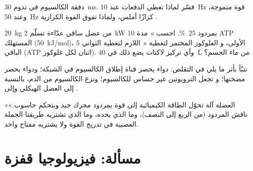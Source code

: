 \begin{exercise}[$\star\star$]\label{exo:b2:muscle-movement:9}
دفقة الكالسيوم في  تدوم \qty{30}{ms}. فسّر لماذا تعطي الدفعات
عند \qty{10}{Hz} قوة متموجة، وعند \qty{50}{Hz} كزازًا أملس،
ولماذا تفوق القوة الكزازية .
\end{exercise}

\begin{exercise}[$\star\star\star$]\label{exo:b2:muscle-movement:10}
\qty{20}{kg} من عضل ساقي عدّاءة تسلّم \qty{2}{kW} مدة
\qty{10}{s} بمردود \qty{25}{\%}. احسب ATP المستهلك (\qty{50}{kJ/mol})،
 اللازم لتغطية الثواني \qty{5}{s} الأولى، و
الغلوكوز المختمر لتغطية الباقي (ATP اثنان لكل غلوكوز). وأي
تركيز لاكتات يضع ذلك في \qty{40}{L} من ماء الجسم؟
\end{exercise}

\begin{exercise}[$\star\star\star$]\label{exo:b2:muscle-movement:11}
تنبّأ بأثر ما يلي في التقلص: دواء يحصر
قناة إطلاق الكالسيوم في الشبكة؛ ودواء يحصر مضختها؛ و
 تجعل التروبونين غير حساس للكالسيوم؛ ونزع
الكالسيوم من الدم، بالنسبة إلى العضل الهيكلي وإلى .
\end{exercise}

\begin{exercise}[$\star\star\star$]\label{exo:b2:muscle-movement:12}
«العضلة آلة تحوّل الطاقة الكيميائية إلى قوة
بمردود محرك جيد وبتحكم
حاسوب.» ناقش المردود (من الربع إلى النصف)، وما الذي
يحده، وما الذي تشتريه طريقتا الجملة العصبية في تدريج القوة
ولا يشتريه مفتاح واحد.
\end{exercise}

\section{مسألة: فيزيولوجيا قفزة}

